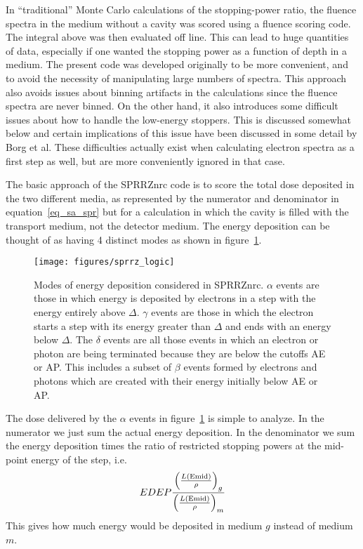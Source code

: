 \documentclass[12pt,twoside]{article}  %
\newcommand{\eqn}[1]{\begin{equation} #1 \end{equation} }
\newcommand{\rspE}[2]{\left( \frac{L({\rm #1})}{\rho} \right)_{#2}}
\begin{document}
In ``traditional'' Monte Carlo calculations of the stopping-power ratio,
the fluence spectra in the medium without a cavity was scored using a
fluence scoring code. The integral above was then evaluated off line.
This can lead to huge quantities of data, especially if one wanted the
stopping power as a function of depth in a medium.  The present code was
developed originally to be more convenient, and to avoid the necessity of
manipulating large numbers of spectra. This approach also avoids issues
about binning artifacts in the calculations since the fluence spectra are
never binned.  On the other hand, it also introduces some difficult issues
about how to handle the low-energy stoppers.  This is discussed somewhat
below and certain implications of this issue have been discussed in some
detail by Borg et al\cite{Bo99a}. These difficulties actually exist when
calculating electron spectra as a first step as well, but are more
conveniently ignored in that case.

The basic approach of the SPRRZnrc code is to score the total dose
deposited in the two different media, as represented by the numerator and
denominator in equation~\ref{eq_sa_spr} but for a calculation in which the
cavity is filled with the transport medium, not the detector medium. The
energy deposition can be thought of as having 4 distinct modes as shown
in figure~\ref{fig_spr_logic}.
\begin{figure}[hbt]
\begin{center}
\texttt{[image: figures/sprrz\_logic]}
\end{center}
\caption[Energy deposition classes in SPRRZnrc]{Modes of energy deposition considered in SPRRZnrc. $\alpha$ events
are those in which energy is deposited by electrons in a step with the
energy entirely above $\Delta$. $\gamma$ events are those in which the
electron starts a step with its energy greater than $\Delta$ and ends with
an energy below $\Delta$. The $\delta$ events are all those events in which
an electron or photon are being terminated because they are below the
cutoffs AE or AP.  This includes a subset of $\beta$ events formed by
electrons and photons which are created with their energy initially below
AE or AP.}
\label{fig_spr_logic}
\end{figure}

The dose delivered by the $\alpha$ events in figure~\ref{fig_spr_logic}
is simple to analyze. In the numerator we just sum the actual energy
deposition. In the denominator we sum the energy deposition times
the ratio of restricted stopping powers at the mid-point energy of the
step, i.e.
\eqn{EDEP \frac{\rspE{Emid}{g}}{\rspE{Emid}{m}}}
This gives how much energy would be deposited in medium $g$ instead of
medium $m$.
\end{document}
